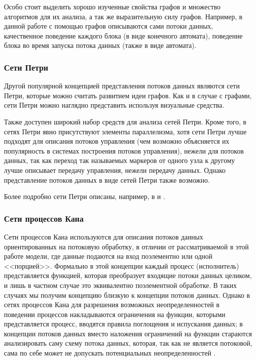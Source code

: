 \documentclass[10pt,a4paper]{article}
\begin{document}
Особо стоит выделить хорошо изученные свойства графов и множество алгоритмов для их анализа, а так же выразительную силу графов.
Например, в данной работе с помощью графов описываются сами потоки данных, качественное поведение каждого блока (в виде конечного автомата),
поведение блока во время запуска потока данных (также в виде автомата).

\subsubsection{Сети Петри}
Другой популярной концепцией представления потоков данных являются сети Петри, которые можно считать развитием идеи графов.
Как и в случае с графами, сети Петри можно наглядно представить используя визуальные средства.

Также доступен широкий набор средств для анализа сетей Петри. Кроме того, в сетях Петри явно присутствуют элементы параллелизма,
хотя сети Петри лучше подходят для описания потоков управления (чем возможно объясняется их популярность в системах построения потоков управления),
нежели для потоков данных, так как переход так называемых маркеров от одного узла к другому лучше
описывает передачу управления, нежели передачу данных. Однако представление потоков данных в виде сетей Петри также возможно.

Более подробно сети Петри описаны, например, в \cite{analysing-control-work-flow} и \cite{workflow-managment}.

\subsubsection{Сети процессов Кана}
Сети процессов Кана используются для описания потоков данных ориентированных на потоковую обработку, в отличии от рассматриваемой в этой работе
модели, где данные подаются на вход поэлементно или одной <<порцией>>.
Формально в этой концепции каждый процесс (исполнитель) представляется функцией, которая преобразует входящие потоки данных целиком, и лишь
в частном случае это эквивалентно поэлементной обработке.
В таких случаях мы получим концепцию близкую к концепции потоков данных. Однако в сетях процессов Кана для разрешения возможных неопределенностей в
поведении процессов накладываются ограничения на функции, которыми представляется процесс, вводятся правила поглощения и испускания данных; в концепции потоков данных вместо наложения ограничений на функции стараются анализировать саму схему потока данных, которая, так как не является потоковой, сама по себе может не допускать потенциальных неопределенностей \cite{data-flow-process-networks}.
\end{document}
